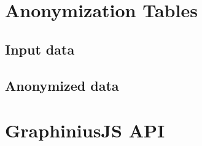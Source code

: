 
% 

\chapter{Anonymization Tables}
\label{App:AppendixA}

\section{Input data}
\label{sect:anon_input_data}

\section{Anonymized data}
\label{sect:anon_output_data}

{
}

\chapter{GraphiniusJS API}
\label{App:AppendixB}

\begin{landscape}
\end{landscape}
